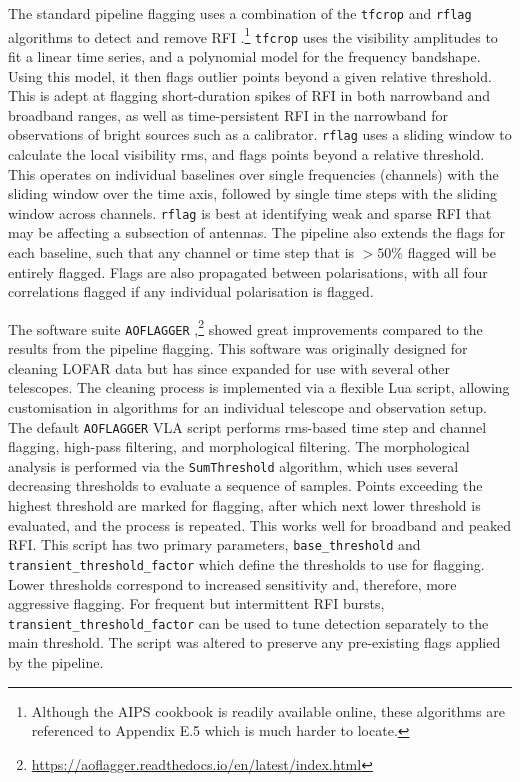 The standard pipeline flagging uses a combination of the \texttt{tfcrop} and \texttt{rflag} algorithms to detect and remove RFI \citep{Greisen2011}.\footnote{Although the AIPS cookbook is readily available online, these algorithms are referenced to Appendix E.5 which is much harder to locate.} \texttt{tfcrop} uses the visibility amplitudes to fit a linear time series, and a polynomial model for the frequency bandshape. Using this model, it then flags outlier points beyond a given relative threshold. This is adept at flagging short-duration spikes of RFI in both narrowband and broadband ranges, as well as time-persistent RFI in the narrowband for observations of bright sources such as a calibrator. \texttt{rflag} uses a sliding window to calculate the local visibility rms, and flags points beyond a relative threshold. This operates on individual baselines over single frequencies (channels) with the sliding window over the time axis, followed by single time steps with the sliding window across channels. \texttt{rflag} is best at identifying weak and sparse RFI that may be affecting a subsection of antennas. The pipeline also extends the flags for each baseline, such that any channel or time step that is $>50\%$ flagged will be entirely flagged. Flags are also propagated between polarisations, with all four correlations flagged if any individual polarisation is flagged.

The software suite \texttt{AOFLAGGER} \citep{Offringa2010, Offringa2012, Offringa2023},\footnote{\url{https://aoflagger.readthedocs.io/en/latest/index.html}} showed great improvements compared to the results from the pipeline flagging. This software was originally designed for cleaning LOFAR data but has since expanded for use with several other telescopes. The cleaning process is implemented via a flexible Lua script, allowing customisation in algorithms for an individual telescope and observation setup. The default \texttt{AOFLAGGER} VLA script performs rms-based time step and channel flagging, high-pass filtering, and morphological filtering. The morphological analysis is performed via the \texttt{SumThreshold} algorithm, which uses several decreasing thresholds to evaluate a sequence of samples. Points exceeding the highest threshold are marked for flagging, after which next lower threshold is evaluated, and the process is repeated. This works well for broadband and peaked RFI. This script has two primary parameters, \texttt{base\_threshold} and \texttt{transient\_threshold\_factor} which define the thresholds to use for flagging. Lower thresholds correspond to increased sensitivity and, therefore, more aggressive flagging. For frequent but intermittent RFI bursts, \texttt{transient\_threshold\_factor} can be used to tune detection separately to the main threshold. The script was altered to preserve any pre-existing flags applied by the pipeline.

